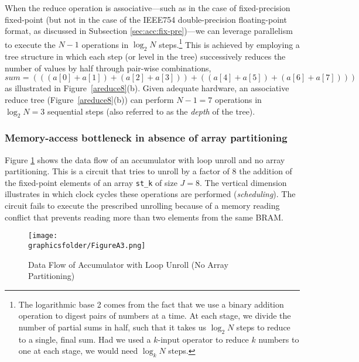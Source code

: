\documentclass[12pt,american]{article}
\newcommand{\Naccsize}{J}
\newcommand{\graphicsfolder}{./graphics}
\begin{document}
When the reduce operation is associative---such as in the case of fixed-precision fixed-point (but not in the case of the IEEE754 double-precision floating-point format, as discussed in Subsection \ref{sec:acc:fix-pre})---we can leverage parallelism to execute the $N-1$ operations in $\log_2 N$ steps.\footnote{The logarithmic base 2 comes from the fact that we use a binary addition operation to digest pairs of numbers at a time.  At each stage, we divide the number of partial sums in half, such that it takes us $\log_2N$ steps to reduce to a single, final sum.  Had we used a $k$-input operator to reduce $k$ numbers to one at each stage, we would need $\log_k N$ steps.} This is achieved by employing a tree structure in which each step (or level in the tree) successively reduces the number of values by half through pair-wise combinations,
\begin{equation*}
sum=(((a[0]+a[1])+(a[2]+a[3]))+((a[4]+a[5])+(a[6]+a[7])))
\end{equation*}
as illustrated in Figure~\ref{areduce8}(b). Given adequate hardware, an associative reduce tree (Figure~\ref{areduce8}(b)) can perform $N-1=7$ operations in $\log_2 N=3$ sequential steps (also referred to as the \textit{depth} of the tree). 

\subsubsection{Memory-access bottleneck in absence of array partitioning}\label{sec:membot}

Figure \ref{fig:acc:fix:unroll8:fail} shows the data flow of an accumulator with loop unroll and no array partitioning. This is a circuit that tries to unroll by a factor of 8 the addition of the fixed-point elements of an array \texttt{st\_k} of size $\Naccsize=8$. The vertical dimension illustrates in which clock cycles these operations are performed (\textit{scheduling}). The circuit fails to execute the prescribed unrolling because of a memory reading conflict that prevents reading more than two elements from the same BRAM.

\begin{figure}[ht!]
\caption{Data Flow of Accumulator with Loop Unroll (No Array Partitioning)}
\begin{center}
\texttt{[image: \\graphicsfolder/FigureA3.png]}
\end{center}
\label{fig:acc:fix:unroll8:fail}
\end{figure}
\end{document}
